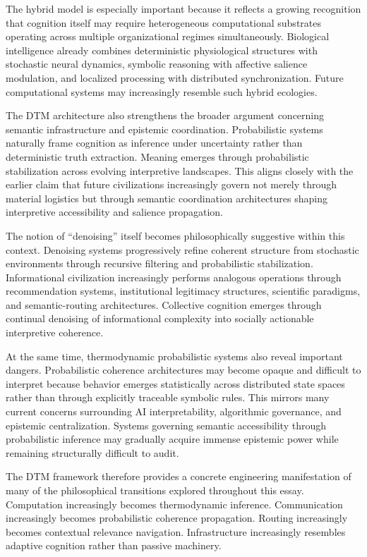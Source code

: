 \documentclass[11pt,a4paper]{article}
\begin{document}
The hybrid model is especially important because it reflects a growing recognition that cognition itself may require heterogeneous computational substrates operating across multiple organizational regimes simultaneously. Biological intelligence already combines deterministic physiological structures with stochastic neural dynamics, symbolic reasoning with affective salience modulation, and localized processing with distributed synchronization. Future computational systems may increasingly resemble such hybrid ecologies.

The DTM architecture also strengthens the broader argument concerning semantic infrastructure and epistemic coordination. Probabilistic systems naturally frame cognition as inference under uncertainty rather than deterministic truth extraction. Meaning emerges through probabilistic stabilization across evolving interpretive landscapes. This aligns closely with the earlier claim that future civilizations increasingly govern not merely through material logistics but through semantic coordination architectures shaping interpretive accessibility and salience propagation.

The notion of ``denoising'' itself becomes philosophically suggestive within this context. Denoising systems progressively refine coherent structure from stochastic environments through recursive filtering and probabilistic stabilization. Informational civilization increasingly performs analogous operations through recommendation systems, institutional legitimacy structures, scientific paradigms, and semantic-routing architectures. Collective cognition emerges through continual denoising of informational complexity into socially actionable interpretive coherence.

At the same time, thermodynamic probabilistic systems also reveal important dangers. Probabilistic coherence architectures may become opaque and difficult to interpret because behavior emerges statistically across distributed state spaces rather than through explicitly traceable symbolic rules. This mirrors many current concerns surrounding AI interpretability, algorithmic governance, and epistemic centralization. Systems governing semantic accessibility through probabilistic inference may gradually acquire immense epistemic power while remaining structurally difficult to audit.

The DTM framework therefore provides a concrete engineering manifestation of many of the philosophical transitions explored throughout this essay. Computation increasingly becomes thermodynamic inference. Communication increasingly becomes probabilistic coherence propagation. Routing increasingly becomes contextual relevance navigation. Infrastructure increasingly resembles adaptive cognition rather than passive machinery.
\end{document}
